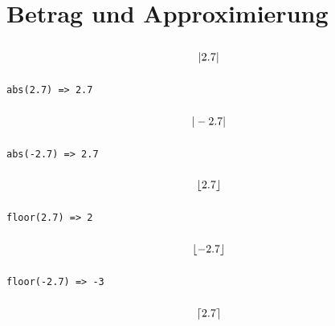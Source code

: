 \documentclass
[
  fontsize = 11pt,
  parskip  = half-,
  BCOR     = 0pt,
  DIV      = 11,
  ngerman
]
{scrartcl}
\begin{document}
\section{Betrag und Approximierung}
\begin{minipage}{\mw}
  \begin{equation*}
    \vphantom{\bigg(}%
    |\num{2.7}|
  \end{equation*}
\end{minipage}%
\hfill
\begin{minipage}{\cw}
\begin{verbatim}
abs(2.7) => 2.7
\end{verbatim}
\end{minipage}
\begin{minipage}{\mw}
  \begin{equation*}
    \vphantom{\bigg(}%
    |\num{-2.7}|
  \end{equation*}
\end{minipage}%
\hfill
\begin{minipage}{\cw}
\begin{verbatim}
abs(-2.7) => 2.7
\end{verbatim}
\end{minipage}
\begin{minipage}{\mw}
  \begin{equation*}
    \vphantom{\bigg(}%
    \lfloor\num{2.7}\rfloor
  \end{equation*}
\end{minipage}%
\hfill
\begin{minipage}{\cw}
\begin{verbatim}
floor(2.7) => 2
\end{verbatim}
\end{minipage}
\begin{minipage}{\mw}
  \begin{equation*}
    \vphantom{\bigg(}%
    \lfloor\num{-2.7}\rfloor
  \end{equation*}
\end{minipage}%
\hfill
\begin{minipage}{\cw}
\begin{verbatim}
floor(-2.7) => -3
\end{verbatim}
\end{minipage}
\begin{minipage}{\mw}
  \begin{equation*}
    \vphantom{\bigg(}%
    \lceil\num{2.7}\rceil
  \end{equation*}
\end{minipage}%
\end{document}
